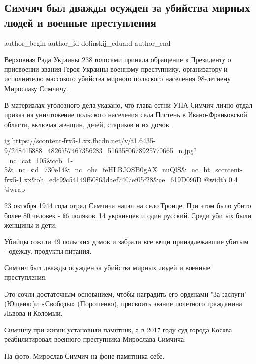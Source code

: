  
 
 
 
 
 
\subsection{Симчич был дважды осужден за убийства мирных людей и военные преступления}
\label{sec:24_10_2021.fb.dolinskij_eduard.1.miroslav_simchich}
 
\ifcmt
 author_begin
   author_id dolinskij_eduard
 author_end
\fi

Верховная Рада Украины 238 голосами приняла обращение к Президенту о присвоении
звания Героя Украины военному преступнику, организатору и исполнителю массового
убийства мирного польского населения 98-летнему Мирославу Симчичу. 

В материалах уголовного дела указано, что глава сотни УПА Симчич лично отдал
приказ на уничтожение польского населения села Пистень в Ивано-Франковской
области, включая женщин, детей, стариков и их домов. 

\ifcmt
  ig https://scontent-frx5-1.xx.fbcdn.net/v/t1.6435-9/248415888_4826757467356283_5163580678925770665_n.jpg?_nc_cat=105&ccb=1-5&_nc_sid=730e14&_nc_ohc=feHLBJOSB0gAX_nuQlS&_nc_ht=scontent-frx5-1.xx&oh=edc99c54149f50863daef7407ef05f28&oe=619D096D
  @width 0.4
  @wrap 
\fi

23 октября 1944 года отряд Симчича напал на село Троице. При этом было убито
более 80 человек - 66 поляков, 14 украинцев и один русский. Среди убитых были
женщины и дети. 

Убийцы сожгли 49 польских домов и забрали все вещи принадлежавшие убитым -
одежду, продукты питания. 

Симчич был дважды осужден за убийства мирных людей и военные преступления. 

Это сочли достаточным основанием, чтобы наградить его орденами "За заслуги"
(Ющенко)и «Свободы» (Порошенко), присвоить звание почетного гражданина Львова и
Коломыи. 

Симчичу при жизни установили памятник, а в 2017 году суд города Косова
реабилитировал военного преступника Мирослава Симчича.

На фото: Мирослав Симчич на фоне памятника себе.

